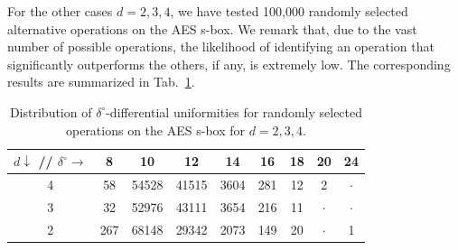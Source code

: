 \documentclass[runningheads,a4paper,english]{llncs}
\begin{document}
For the other cases $d=2,3,4$, we have tested 100,000 randomly selected alternative operations on the AES s-box. We remark that, due to the vast number of possible operations, the likelihood of identifying an operation that significantly outperforms the others, if any, is extremely low. The corresponding results are summarized in Tab.~\ref{tab:random-d}.  

\begin{table}[h!]
\centering
\begin{tabular}{c||c|c|c|c|c|c|c|c|}
$d \downarrow$ // $\delta^\circ \rightarrow$ & 8 & 10 & 12 & 14 & 16 & 18 & 20 & 24 \\
\hline\hline
4 & 58 & 54528 & 41515 & 3604 & 281 & 12 & 2 & $\cdot$ \\
\hline
3 & 32 & 52976 & 43111 & 3654 & 216 & 11 & $\cdot$ & $\cdot$ \\
\hline
2 & 267 & 68148 & 29342 & 2073 & 149 & 20 & $\cdot$ & 1 \\
\hline
\end{tabular}
\vspace{2mm} 
\label{tab:random-d}
\caption{Distribution of $\delta^\circ$-differential uniformities for randomly selected operations on the AES s-box for $d=2,3,4$.}
\end{table}
\end{document}
